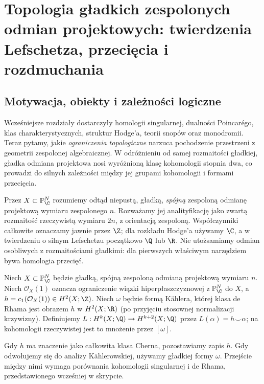 \chapter{Topologia gładkich zespolonych odmian projektowych: twierdzenia Lefschetza, przecięcia i rozdmuchania}
\label{ch:xvii-topologia-odmian}

\providecommand{\atlasref}[2]{#2}

\section{Motywacja, obiekty i zależności logiczne}
Wcześniejsze rozdziały dostarczyły homologii singularnej, dualności
Poincarégo, klas charakterystycznych, struktur Hodge'a, teorii snopów
oraz monodromii. Teraz pytamy, jakie \emph{ograniczenia topologiczne}
narzuca pochodzenie przestrzeni z geometrii zespolonej algebraicznej.
W odróżnieniu od samej rozmaitości gładkiej, gładka odmiana projektowa
nosi wyróżnioną klasę kohomologii stopnia dwa, co prowadzi do
silnych zależności między jej grupami kohomologii i formami przecięcia.

Przez $X\subset\mathbb P^N_\C$ rozumiemy odtąd niepustą,
gładką, \emph{spójną} zespoloną odmianę projektową wymiaru zespolonego
$n$. Rozważamy jej analityfikację jako zwartą rozmaitość
rzeczywistą wymiaru $2n$, z orientacją zespoloną. Współczynniki
całkowite oznaczamy jawnie przez $\Z$; dla rozkładu Hodge'a używamy
$\C$, a w twierdzeniu o silnym Lefschetzu początkowo $\Q$ lub $\R$.
Nie utożsamiamy odmian osobliwych z rozmaitościami gładkimi: dla
pierwszych właściwym narzędziem bywa homologia przecięć.

\begin{definicja}
Niech $X\subset\mathbb P^N_\C$ będzie gładką,
spójną zespoloną odmianą projektową wymiaru $n$.
Niech $\mathcal O_X(1)$ oznacza ograniczenie wiązki hiperpłaszczyznowej
z $\mathbb P^N_\C$ do $X$, a $h=c_1(\mathcal O_X(1))\in
H^2(X;\Z)$. Niech $\omega$ będzie formą Kählera, której klasa
de Rhama jest obrazem $h$ w $H^2(X;\R)$ (po przyjęciu stosownej
normalizacji krzywizny). Definiujemy
$L:H^k(X;\Q)\to H^{k+2}(X;\Q)$ przez $L(\alpha)=h\smile\alpha$;
na kohomologii rzeczywistej jest to mnożenie przez $[\omega]$.
\end{definicja}
\begin{uwaga}
Gdy $h$ ma znaczenie jako całkowita klasa Cherna, pozostawiamy
zapis $h$. Gdy odwołujemy się do analizy Kählerowskiej,
używamy gładkiej formy $\omega$. Przejście między nimi wymaga
porównania kohomologii singularnej i de Rhama, przedstawionego
wcześniej w skrypcie.
\end{uwaga}

